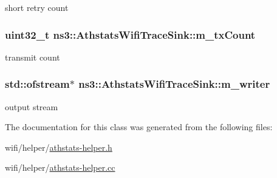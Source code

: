 short retry count 

\subsubsection[{\texorpdfstring{m\+\_\+tx\+Count}{m_txCount}}]{\setlength{\rightskip}{0pt plus 5cm}uint32\+\_\+t ns3\+::\+Athstats\+Wifi\+Trace\+Sink\+::m\+\_\+tx\+Count\hspace{0.3cm}{\ttfamily [private]}}\hypertarget{classns3_1_1AthstatsWifiTraceSink_a345943653ca6423c98ecfa5c9869e6e3}{}\label{classns3_1_1AthstatsWifiTraceSink_a345943653ca6423c98ecfa5c9869e6e3}


transmit count 

\subsubsection[{\texorpdfstring{m\+\_\+writer}{m_writer}}]{\setlength{\rightskip}{0pt plus 5cm}std\+::ofstream$\ast$ ns3\+::\+Athstats\+Wifi\+Trace\+Sink\+::m\+\_\+writer\hspace{0.3cm}{\ttfamily [private]}}\hypertarget{classns3_1_1AthstatsWifiTraceSink_a465d42aea28db75a969edc01900f8bc0}{}\label{classns3_1_1AthstatsWifiTraceSink_a465d42aea28db75a969edc01900f8bc0}


output stream 



The documentation for this class was generated from the following files\+:\begin{DoxyCompactItemize}
\item 
wifi/helper/\hyperlink{athstats-helper_8h}{athstats-\/helper.\+h}\item 
wifi/helper/\hyperlink{athstats-helper_8cc}{athstats-\/helper.\+cc}\end{DoxyCompactItemize}
